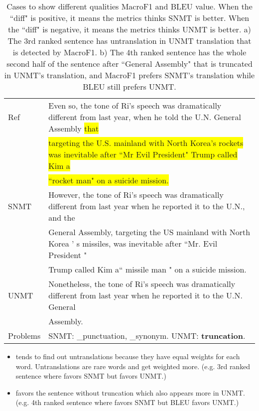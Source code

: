\begin{table*}[htbp]
{\begin{tabular}{l|l}
Ref & Even so, the tone of Ri's speech was dramatically different from last year, when he told the U.N. General Assembly \colorbox{yellow}{that} \\
&\colorbox{yellow}{targeting the U.S. mainland with North Korea's rockets was inevitable after ``Mr Evil President" Trump called Kim a} \\
&\colorbox{yellow}{``rocket man" on a suicide mission.}\\\hline

SNMT& However, the tone of Ri's speech was dramatically different from last year when he reported it to the U.N., and the \\
&General Assembly, targeting the US mainland with North Korea ' s missiles, was inevitable after ``Mr. Evil President " \\
&Trump called Kim a`` missile man " on a suicide mission.\\\hline

UNMT& Nonetheless, the tone of Ri's speech was dramatically different from last year when he reported it to the U.N. General \\
&Assembly.\\\hline

Problems&SNMT: \_punctuation, \_synonym. UNMT: \textbf{truncation}.\\


    \end{tabular}
    }
    \caption{Cases to show different qualities MacroF1 and BLEU value. When the ``diff" is positive, it means the metrics thinks SNMT is better. When the ``diff" is negative, it means the metrics thinks UNMT is better. a) The 3rd ranked sentence has untranslation in UNMT translation that is detected by MacroF1. b) The 4th ranked sentence has the whole second half of the sentence after ``General Assembly" that is truncated in UNMT's translation, and MacroF1 prefers SNMT's translation while BLEU still prefers UNMT. }
    \label{tab:diff_mf1_bleu}
\end{table*}


\begin{itemize}
    \item {} tends to find out untranslations because they have equal weights for each word. Untranslations are rare words and get weighted more. (e.g. 3rd ranked sentence where  favors SNMT but \bleu favors UNMT.) %
    \item {} favors the sentence without truncation which also appears more in UNMT. (e.g. 4th ranked sentence where  favors SNMT but BLEU favors UNMT.)  %
\end{itemize}

